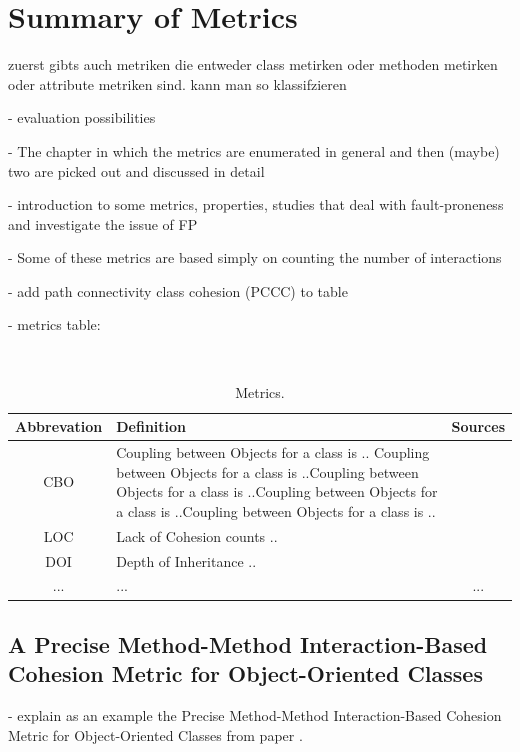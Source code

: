 \section{Summary of Metrics}\label{analysis}

\cite{lanza2002beyond} zuerst gibts auch metriken die entweder class metirken oder methoden metirken oder attribute metriken sind. kann man so klassifzieren

- evaluation possibilities

- The chapter in which the metrics are enumerated in general and then (maybe) two are picked out and discussed in detail

- introduction to some metrics, properties, studies that deal with fault-proneness and investigate the issue of FP

- Some of these metrics are based simply on counting the number of interactions

- add path connectivity class cohesion (PCCC) to table

- metrics table:

\begin{table}
	\caption{Metrics.}~\label{tab:metrics}
	
	\setlength\tabcolsep{3pt}
	\renewcommand{\arraystretch}{1.4}%
	\begin{tabularx}{\columnwidth}{ | c | p{5.8cm} || c | }
		\hline
		Abbrevation & Definition & Sources \\ \hline\hline
		CBO & Coupling between Objects for a class is .. Coupling between Objects for a class is ..Coupling between Objects for a class is ..Coupling between Objects for a class is ..Coupling between Objects for a class is ..& \cite{b14chidamber1994metrics} \\ \hline
		LOC & Lack of Cohesion counts ..  & \cite{b15chidamber1991towards} \\ \hline
		DOI & Depth of Inheritance .. & \cite{b15chidamber1991towards} \\ \hline
		... & ... & ... \\ \hline
	\end{tabularx}
\end{table}


\subsection{A Precise Method-Method Interaction-Based Cohesion Metric for Object-Oriented Classes}

- explain as an example the Precise Method-Method Interaction-Based Cohesion Metric for Object-Oriented Classes from paper \cite{b8al2012precise}.

